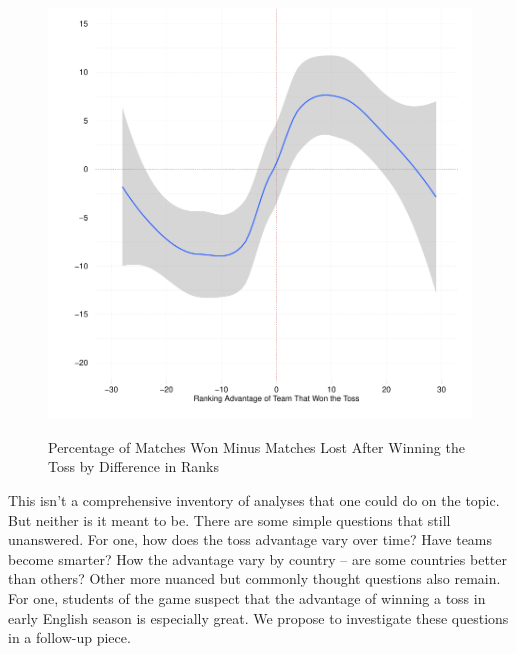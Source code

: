 \documentclass[11pt]{article}
\begin{document}
\begin{figure}[htbp]
\centering
\caption{Percentage of Matches Won Minus Matches Lost After Winning the Toss by Difference in Ranks}
\includegraphics[scale=.85]{../figs/winbyRank.pdf}
\label{fig:ranks}
\end{figure}

This isn't a comprehensive inventory of analyses that one could do on the topic. But neither is it meant to be. There are some simple questions that still unanswered. For one, how does the toss advantage vary over time? Have teams become smarter? How the advantage vary by country -- are some countries better than others? Other more nuanced but commonly thought questions also remain. For one, students of the game suspect that the advantage of winning a toss in early English season is especially great. We propose to investigate these questions in a follow-up piece.

\clearpage


\end{document}
